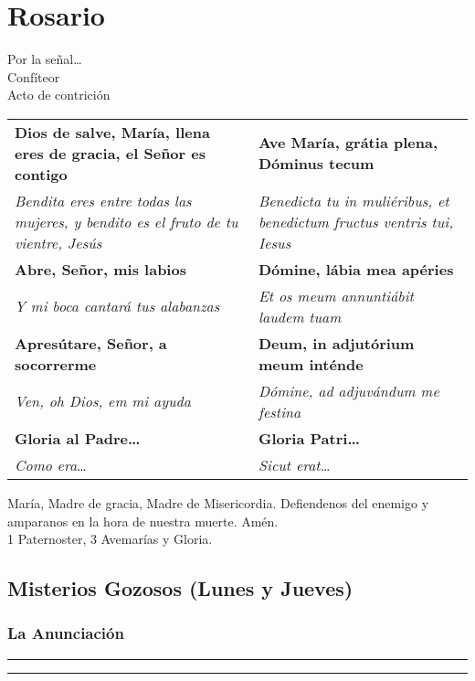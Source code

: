 \documentclass[11pt,a4paper]{report}
\begin{document}
    \section*{Rosario}

    \begin{center}
        Por la señal{\ldots}\\
        Confíteor\\
        Acto de contrición
    \end{center}
    
    \begin{longtable} { p{} p{} }
        \textbf{Dios de salve, María, llena eres de gracia, el Señor es contigo} & \textbf{Ave María, grátia plena, Dóminus tecum}\\
        \textit{Bendita eres entre todas las mujeres, y bendito es el fruto de tu vientre, Jesús} & 
        \textit{Benedicta tu in muliéribus, et benedictum fructus ventris tui, Iesus}\\
        \textbf{Abre, Señor, mis labios} & \textbf{Dómine, lábia mea apéries}\\
        \textit{Y mi boca cantará tus alabanzas} & \textit{Et os meum annuntiábit laudem tuam}\\
        \textbf{Apresútare, Señor, a socorrerme} & \textbf{Deum, in adjutórium meum inténde}\\
        \textit{Ven, oh Dios, em mi ayuda} & \textit{Dómine, ad adjuvándum me festina}\\ 
        \textbf{Gloria al Padre{\ldots}} & \textbf{Gloria Patri{\ldots}}\\
        \textit{Como era}{\ldots} & \textit{Sicut erat}{\ldots}\\
    \end{longtable}

    \begin{center}
        María, Madre de gracia, Madre de Misericordia. Defiendenos del enemigo y amparanos en la hora de nuestra muerte. Amén.\\
        1 Paternoster, 3 Avemarías y Gloria.
    \end{center}
    
    \subsection*{Misterios Gozosos (Lunes y Jueves)}

    \subsubsection*{La Anunciación}
    
    
    \rule{\textwidth}{0.5pt}
    
    \rule{\textwidth}{0.5pt}
    
\end{document}
